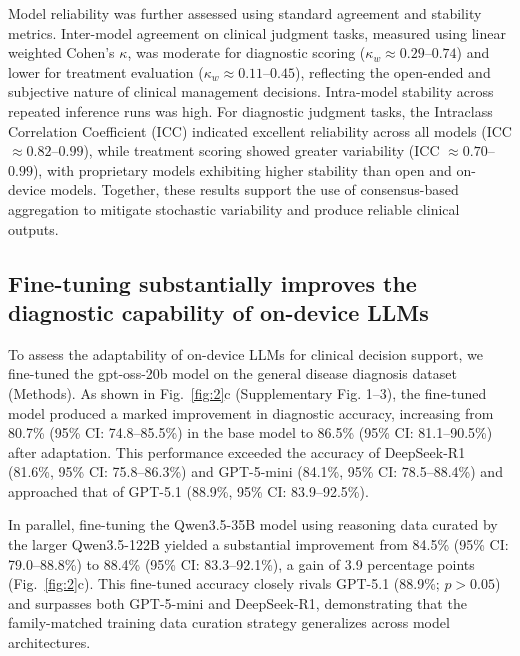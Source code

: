 \documentclass[10pt,journal,compsoc, onecolumn]{IEEEtran}
\begin{document}
Model reliability was further assessed using standard agreement and stability metrics.
Inter-model agreement on clinical judgment tasks, measured using linear weighted Cohen’s $\kappa$, was moderate for diagnostic scoring ($\kappa_w \approx 0.29$--$0.74$) and lower for treatment evaluation ($\kappa_w \approx 0.11$--$0.45$), reflecting the open-ended and subjective nature of clinical management decisions.
Intra-model stability across repeated inference runs was high. For diagnostic judgment tasks, the Intraclass Correlation Coefficient (ICC) indicated excellent reliability across all models (ICC $\approx 0.82$--$0.99$), while treatment scoring showed greater variability (ICC $\approx 0.70$--$0.99$), with proprietary models exhibiting higher stability than open and on-device models.
Together, these results support the use of consensus-based aggregation to mitigate stochastic variability and produce reliable clinical outputs.




\subsection*{Fine-tuning substantially improves the diagnostic capability of on-device LLMs}
To assess the adaptability of on-device LLMs for clinical decision support, we fine-tuned the gpt-oss-20b model on the general disease diagnosis dataset (Methods). As shown in Fig.~\ref{fig:2}c (Supplementary Fig. 1--3), the fine-tuned model produced a marked improvement in diagnostic accuracy, increasing from 80.7\% (95\% CI: 74.8--85.5\%) in the base model to 86.5\% (95\% CI: 81.1--90.5\%) after adaptation. This performance exceeded the accuracy of DeepSeek-R1 (81.6\%, 95\% CI: 75.8--86.3\%) and GPT-5-mini (84.1\%, 95\% CI: 78.5--88.4\%) and approached that of GPT-5.1 (88.9\%, 95\% CI: 83.9--92.5\%).

In parallel, fine-tuning the Qwen3.5-35B model using reasoning data curated by the larger Qwen3.5-122B yielded a substantial improvement from 84.5\% (95\% CI: 79.0--88.8\%) to 88.4\% (95\% CI: 83.3--92.1\%), a gain of 3.9 percentage points (Fig.~\ref{fig:2}c). This fine-tuned accuracy closely rivals GPT-5.1 (88.9\%; $p>0.05$) and surpasses both GPT-5-mini and DeepSeek-R1, demonstrating that the family-matched training data curation strategy generalizes across model architectures.
\end{document}

